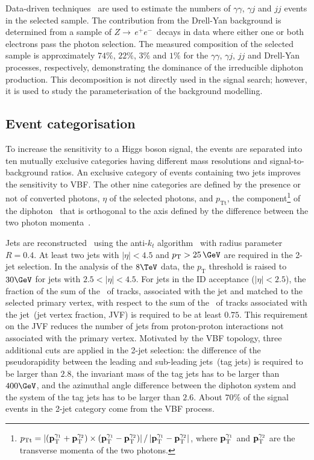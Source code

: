 \documentclass[final,3p,times,twocolumn]{elsarticle}
\newcommand{\ptt}{\ensuremath{p_{\mathrm{Tt}}}}
\newcommand{\ztoee}{\ensuremath{Z{\rightarrow\,}e^+e^-}}
\begin{document}
Data-driven techniques~\cite{Collaboration:2011ww} are used to estimate the numbers of $\gamma\gamma$, $\gamma j$ and $jj$ events in the selected sample.
The contribution from the Drell-Yan background is determined from a sample of \ztoee\ decays in data where either one or both electrons pass the photon selection.
The measured composition of the selected sample is approximately $74\%$, $22\%$, $3\%$ and $1\%$ for the $\gamma\gamma$, $\gamma j$, $jj$ and Drell-Yan processes, respectively, demonstrating the dominance of the irreducible diphoton production.
This decomposition is not directly used in the signal search; however, it is used to study the parameterisation of the background modelling.

\subsection{Event categorisation}
\label{sec:hggeventcat}
To increase the sensitivity to a Higgs boson signal, the events are separated
into ten mutually exclusive categories having different mass resolutions and signal-to-background ratios.
An exclusive category of events containing two jets improves the sensitivity to VBF.
The other nine categories are defined by the presence or not of converted photons, $\eta$ of the selected photons, and \ptt,
the component\footnote{$p_{\mathrm{Tt}} = {\left|({{\bf p}_\mathrm{T}^{\gamma_1}} + {{\bf p}_\mathrm{T}^{\gamma_2}}) \times ({{\bf p}_\mathrm{T}^{\gamma_1}} -{{\bf p}_\mathrm{T}^{\gamma_2}})\right|/\left|{{\bf p}_\mathrm{T}^{\gamma_1}} - {{\bf p}_\mathrm{T}^{\gamma_2}}\right|}$,
where ${{\bf p}_\mathrm{T}^{\gamma_1}}$ and ${{\bf p}_\mathrm{T}^{\gamma_2}}$ are the transverse momenta of the two photons.}
of the diphoton \pt\ that is orthogonal to the axis defined by the difference between the two photon momenta~\cite{PTT_OPAL,PTT_ZBoson}.

Jets are reconstructed~\cite{JES} using the anti-$k_t$ algorithm~\cite{Cacciari:2008gp} with radius parameter $R=0.4$.
At least two jets with $\left|\eta\right|<4.5$ and $p_{\mathrm{T}} > 25\,\GeV$ are required in the 2-jet selection.
In the analysis of the $8\TeV$ data, the $p_{\mathrm{T}}$ threshold is raised to $30\GeV$ for jets with $2.5 < |\eta| < 4.5$.
For jets in the ID acceptance ($|\eta|<2.5$),
the fraction of the sum of the \pt\ of tracks, associated with the jet and matched to the selected primary vertex, with respect to the sum of the \pt\ of tracks associated with the jet~(jet vertex fraction, JVF) is required to be at least $0.75$.
This requirement on the JVF reduces the number of jets from proton-proton
interactions not associated with the primary vertex.
Motivated by the VBF topology, three additional cuts are applied in the 2-jet selection:
the difference of the pseudorapidity between the leading and sub-leading jets~(tag jets) is required to be larger than $2.8$,
the invariant mass of the tag jets has to be larger than $400\GeV$, and
the azimuthal angle difference between the diphoton system and the system of the tag jets has to be larger than $2.6$.
About $70\%$ of the signal events in the 2-jet category come from the VBF process.
\end{document}
